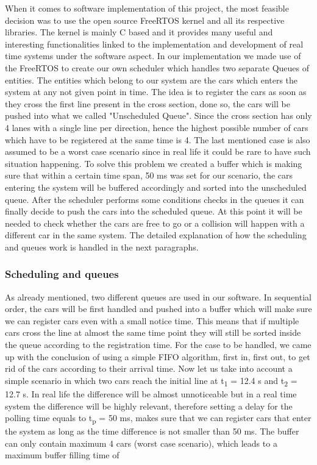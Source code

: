 \documentclass[conference]{IEEEtran}
\begin{document}
When it comes to software implementation of this project, the most feasible decision was to use the open source FreeRTOS kernel and all its respective libraries. The kernel is mainly C based and it provides many useful and interesting functionalities linked to the implementation and development of real time systems under the software aspect. In our implementation we made use of the FreeRTOS to create our own scheduler which handles two separate Queues of entities. The entities which belong to our system are the cars which enters the system at any not given point in time. The idea is to register the cars as soon as they cross the first line present in the cross section, done so, the cars will be pushed into what we called "Unscheduled Queue". Since the cross section has only 4 lanes with a single line per direction, hence the highest possible number of cars which have to be registered at the same time is 4. The last mentioned case is also assumed to be a worst case scenario since in real life it could be rare to have such situation happening. To solve this problem we created a buffer which is making sure that within a certain time span, 50 ms was set for our scenario, the cars entering the system will be buffered accordingly and sorted into the unscheduled queue. After the scheduler performs some conditions checks in the queues it can finally decide to push the cars into the scheduled queue. At this point it will be needed to check whether the cars are free to go or a collision will happen with a different car in the same system. The detailed explanation of how the scheduling and queues work is handled in the next paragraphs.

\subsubsection{Scheduling and queues}

As already mentioned, two different queues are used in our software. In sequential order, the cars will be first handled and pushed into a buffer which will make sure we can register cars even with a small notice time. This means that if multiple cars cross the line at almost the same time point they will still be sorted inside the queue according to the registration time. For the case to be handled, we came up with the conclusion of using a simple FIFO algorithm, first in, first out, to get rid of the cars according to their arrival time. Now let us take into account a simple scenario in which two cars reach the initial line at t\textsubscript{1} = 12.4 s and t\textsubscript{2} = 12.7 s. In real life the difference will be almost unnoticeable but in a real time system the difference will be highly relevant, therefore setting a delay for the polling time equals to t\textsubscript{p} = 50 ms, makes sure that we can register cars that enter the system as long as the time difference is not smaller than 50 ms. The buffer can only contain maximum 4 cars (worst case scenario), which leads to a maximum buffer filling time of
\end{document}
